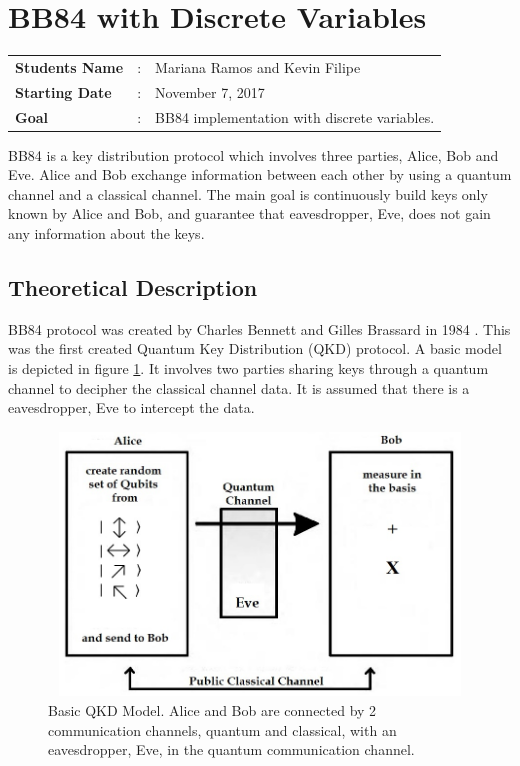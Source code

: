 \clearpage
\section{BB84 with Discrete Variables}

\begin{tcolorbox}	
\begin{tabular}{p{2.75cm} p{0.2cm} p{10.5cm}} 	
\textbf{Students Name}  &:& Mariana Ramos and Kevin Filipe\\
\textbf{Starting Date} &:& November 7, 2017\\
\textbf{Goal}          &:& BB84 implementation with discrete variables.
\end{tabular}
\end{tcolorbox}

BB84 is a key distribution protocol which involves three parties, Alice, Bob and Eve. Alice and Bob exchange information between each other by using a quantum channel and a classical channel. The main goal is continuously build keys only known by Alice and Bob, and guarantee that eavesdropper, Eve, does not gain any information about the keys.


\subsection{Theoretical Description}

BB84 protocol was created by Charles Bennett and Gilles Brassard in 1984 \cite{BB84}. This was the first created Quantum Key Distribution (QKD) protocol. A basic model is depicted in figure \ref{fig:qkd model}. It involves two parties sharing keys through a quantum channel to decipher the classical channel data. It is assumed that there is a eavesdropper, Eve to intercept the data.

\begin{figure}[H]
	\centering
	\includegraphics[width=1.0\textwidth,height=7cm]{./sdf/bb84_with_discrete_variables/figures/QKD_Model.png}
	\caption{Basic QKD Model. Alice and Bob are connected by 2 communication channels, quantum and classical, with an eavesdropper, Eve, in the quantum communication channel. \cite{iqo}}\label{fig:qkd model}
\end{figure}


